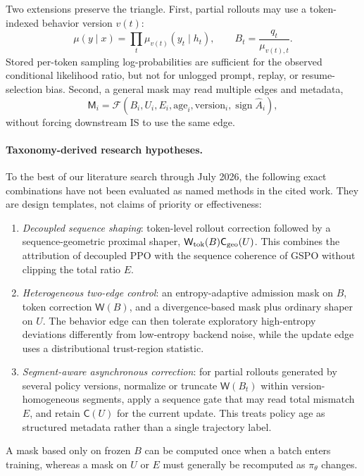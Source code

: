 \documentclass[10pt,twocolumn]{article}
\newcommand{\beh}{\mu}
\newcommand{\prox}{q}
\newcommand{\cur}{\pi_\theta}
\newcommand{\B}{B}
\newcommand{\U}{U}
\newcommand{\E}{E}
\newcommand{\Mask}{\mathsf{M}}
\newcommand{\Weight}{\mathsf{W}}
\newcommand{\Shape}{\mathsf{C}}
\begin{document}
Two extensions preserve the triangle.  First, partial rollouts may use a token-indexed behavior version \(v(t)\):
\begin{equation}
    \beh(y\mid x)=\prod_t\beh_{v(t)}(y_t\mid h_t),\qquad
    \B_t=\frac{\prox_t}{\beh_{v(t),t}}.
\end{equation}
Stored per-token sampling log-probabilities are sufficient for the observed conditional likelihood ratio, but not for unlogged prompt, replay, or resume-selection bias.  Second, a general mask may read multiple edges and metadata,
\begin{equation}
\Mask_i=\mathcal F(\B_i,\U_i,\E_i,\text{age}_i,
\text{version}_i,\operatorname{sign}\hat A_i),
\end{equation}
without forcing downstream IS to use the same edge.

\paragraph{Taxonomy-derived research hypotheses.}
To the best of our literature search through July 2026, the following exact combinations have not been evaluated as named methods in the cited work.  They are design templates, not claims of priority or effectiveness:
\begin{enumerate}[leftmargin=*]
    \item \emph{Decoupled sequence shaping}: token-level rollout correction followed by a sequence-geometric proximal shaper, \(\Weight_{\rm tok}(\B)\Shape_{\rm geo}(\U)\).  This combines the attribution of decoupled PPO with the sequence coherence of GSPO without clipping the total ratio \(\E\).
    \item \emph{Heterogeneous two-edge control}: an entropy-adaptive admission mask on \(\B\), token correction \(\Weight(\B)\), and a divergence-based mask plus ordinary shaper on \(\U\).  The behavior edge can then tolerate exploratory high-entropy deviations differently from low-entropy backend noise, while the update edge uses a distributional trust-region statistic.
    \item \emph{Segment-aware asynchronous correction}: for partial rollouts generated by several policy versions, normalize or truncate \(\Weight(\B_t)\) within version-homogeneous segments, apply a sequence gate that may read total mismatch \(\E\), and retain \(\Shape(\U)\) for the current update.  This treats policy age as structured metadata rather than a single trajectory label.
\end{enumerate}
A mask based only on frozen \(\B\) can be computed once when a batch enters training, whereas a mask on \(\U\) or \(\E\) must generally be recomputed as \(\cur\) changes.
\end{document}
